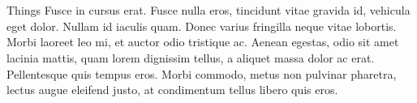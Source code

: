 \documentclass[12pt]{beamer}
\renewcommand{\maketitle}{%
	\begin{center}%
		\Huge\inserttitle\\[5mm]%
		\Large\insertauthor\\[5mm]%
		\Large\insertinstitute%
	\end{center}%
	\vspace*{-1ex}%
}
\begin{document}
\begin{frame}{\maketitle}
\begin{columns}
\begin{column}{.45\textwidth}
\begin{block}{Things}
					Fusce in cursus erat. Fusce nulla eros, tincidunt vitae gravida id, vehicula eget dolor. Nullam id iaculis quam. Donec varius fringilla neque vitae lobortis. Morbi laoreet leo mi, et auctor odio tristique ac. Aenean egestas, odio sit amet lacinia mattis, quam lorem dignissim tellus, a aliquet massa dolor ac erat. Pellentesque quis tempus eros. Morbi commodo, metus non pulvinar pharetra, lectus augue eleifend justo, at condimentum tellus libero quis eros.
				\end{block}
			\end{column}
		\end{columns}
	\end{frame}
\centering
\end{document}
